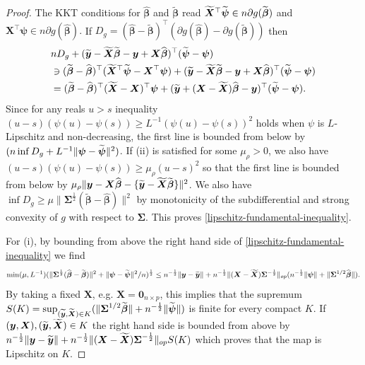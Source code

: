 \documentclass[11pt]{amsart}
\numberwithin{equation}{section}
\numberwithin{equation}{section}
\def\mathbold{\boldsymbol} %
\def\bX{\mathbold{X}}\def\hbX{{\widehat{\bX}}}\def\tbX{{\widetilde{\bX}}}\def\bXbar{{\overline \bX}}
\def\by{\mathbold{y}}\def\yhat{\widehat{y}}\def\ytil{\widetilde{y}}\def\ybar{{\overline y}}\def\vby{{\bf y}}
\def\bbeta{\mathbold{\beta}}\def\betahat{\widehat{\beta}}\def\hbeta{\widehat{\beta}}
\def\hbbeta{{{\widehat{\bbeta}}}}
\def\tbbeta{\widetilde{\bbeta}}
\def\bSigma{\mathbold{\Sigma}}\def\hbSigma{{\widehat{\bSigma}}}
\def\bpsi{\mathbold{\psi}}\def\psihat{\widehat{\psi}}\def\hpsi{\widehat{\psi}}
\begin{document}
\begin{proof}
    The KKT conditions for $\hbbeta$ and $\tbbeta$ read
$\tbX{}^\top\tbpsi \in n \partial g(\tbbeta)$ and
$\bX^\top\bpsi \in n\partial g(\hbbeta).$
If $D_g = (\hbbeta - \tbbeta)^\top(\partial g(\hbbeta) - \partial g(\tbbeta))$
then 
\begin{align}
    \nonumber
    &nD_g
      + (\tby - \tbX\tbbeta - \by + \bX\hbbeta)^\top
      (\tbpsi - \bpsi)
      \\&\ni (\tbbeta- \hbbeta)^\top(\tbX{}^\top \tbpsi - \bX^\top\bpsi)
      + (\tby - \tbX\tbbeta - \by + \bX\hbbeta)^\top
      (\tbpsi - \bpsi)
      \label{D_g-fundamental-ineq}
    \\&=
    (\tbbeta -\hbbeta)^\top(\tbX-\bX)^\top\bpsi
    +
    (\tby + (\bX-\tbX)\hbbeta -\by)^\top(\tbpsi - \bpsi).
    \nonumber
\end{align}
Since for any reals $u>s$ inequality
$(u-s)(\psi(u)-\psi(s)) \ge L^{-1} (\psi(u) - \psi(s))^2$ holds
when $\psi$ is $L$-Lipschitz and non-decreasing,
the first line is bounded from below by
$(n \inf D_g + L^{-1} \|\bpsi - \tbpsi\|^2)$.
If (ii) is satisfied for some $\mu_\rho>0$,
we also have $(u-s)(\psi(u)-\psi(s)) \ge \mu_\rho (u - s)^2$
so that the first line is bounded from below by
$\mu_\rho \|\by-\bX\hbbeta - \{\tby-\tbX\tbbeta\}\|^2$.
We also have $\inf D_g\ge \mu \|\bSigma^{\frac12}(\tbbeta-\hbbeta)\|^2$ by monotonicity
of the subdifferential and strong convexity of $g$
with respect to $\bSigma$.
This proves \eqref{lipschitz-fundamental-inequality}.

For (i), by bounding from above the right hand side of 
\eqref{lipschitz-fundamental-inequality} we find
\begin{align*}
    \min(\mu, L^{-1})(\|\bSigma^{\frac12}(\hbbeta-\tbbeta)\|^2+\|\bpsi-\tbpsi\|^2/n)^{\frac12}
\le
n^{-\frac12}\|\by-\tby\|
+
n^{-\frac12}\|(\bX-\tbX)\bSigma^{-\frac12}\|_{op}(n^{-\frac12}\|\bpsi\| + \|\bSigma^{1/2}\hbbeta\|).
\end{align*}
By taking a fixed $\bX$, e.g. $\bX=\mathbf{0}_{n\times p}$,
this implies that the supremum
$S(K) = \sup_{(\tby,\tbX)\in K}(\|\bSigma^{1/2}\smash{\tbbeta}\|+n^{-\frac12}\|\smash{\tbpsi}\|)$ is finite
for every compact $K$. If $(\by,\bX),(\smash{\tby},\smash{\tbX})\in K$
the right hand side is bounded from above
by 
$n^{-\frac12}\|\by-\smash{\tby}\|
+
n^{-\frac12}\|(\bX-\smash{\tbX})\bSigma^{-\frac12}\|_{op} S(K)$
which proves that the map is Lipschitz on $K$.


\end{proof}
\end{document}
